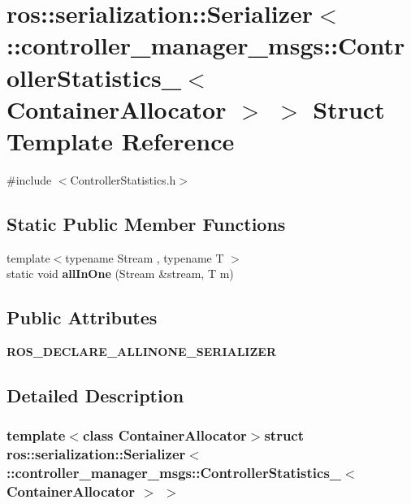 \section{ros\-:\-:serialization\-:\-:\-Serializer$<$ \-:\-:controller\-\_\-manager\-\_\-msgs\-:\-:\-Controller\-Statistics\-\_\-$<$ \-Container\-Allocator $>$ $>$ \-Struct \-Template \-Reference}
\label{structros_1_1serialization_1_1Serializer_3_01_1_1controller__manager__msgs_1_1ControllerStatistie8392c6e7fb9286690bd4c7cc9106f66}


{\ttfamily \#include $<$\-Controller\-Statistics.\-h$>$}

\subsection*{\-Static \-Public \-Member \-Functions}
\begin{DoxyCompactItemize}
\item 
{\footnotesize template$<$typename Stream , typename T $>$ }\\static void {\bf all\-In\-One} (\-Stream \&stream, \-T m)
\end{DoxyCompactItemize}
\subsection*{\-Public \-Attributes}
\begin{DoxyCompactItemize}
\item 
{\bf \-R\-O\-S\-\_\-\-D\-E\-C\-L\-A\-R\-E\-\_\-\-A\-L\-L\-I\-N\-O\-N\-E\-\_\-\-S\-E\-R\-I\-A\-L\-I\-Z\-E\-R}
\end{DoxyCompactItemize}


\subsection{\-Detailed \-Description}
\subsubsection*{template$<$class Container\-Allocator$>$struct ros\-::serialization\-::\-Serializer$<$ \-::controller\-\_\-manager\-\_\-msgs\-::\-Controller\-Statistics\-\_\-$<$ Container\-Allocator $>$ $>$}



